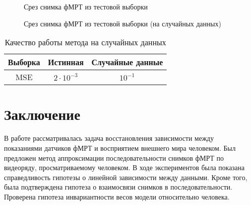 \documentclass[a4paper, 12pt]{extarticle}
\begin{document}
\begin{figure}[h!]
	\centering
	\hfill
	\hfill
	\caption{Срез снимка фМРТ из тестовой выборки}
	\label{fig:recover}
\end{figure}

\begin{figure}[h!]
	\centering
	\hfill
	\hfill
	\caption{Срез снимка фМРТ из тестовой выборки (на случайных данных)}
	\label{fig:random}
\end{figure}

\begin{table}[h!]
	\centering
	\caption{Качество работы метода на случайных данных}
	\begin{tabular}{|c|c|c|}
		\hline
		Выборка & Истинная          & Случайные данные \\ \hline \hline
		MSE     & $2 \cdot 10^{-3}$ & $10^{-1}$        \\ \hline
	\end{tabular}
	\label{table:random}
\end{table}

\newpage

\section{Заключение}

В работе рассматривалась задача восстановления зависимости между показаниями
датчиков фМРТ и восприятием внешнего мира человеком.
Был предложен метод аппроксимации последовательности снимков фМРТ по видеоряду,
просматриваемому человеком.
В ходе экспериментов была показана справедливость гипотезы о линейной зависимости между данными.
Кроме того, была подтверждена гипотеза о взаимосвязи снимков в последовательности.
Проверена гипотеза инвариантности весов модели относительно человека.

\newpage



\end{document}
